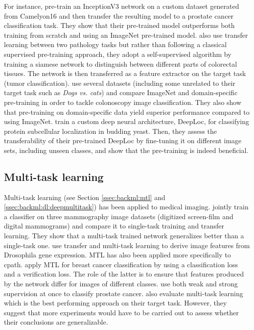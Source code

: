 For instance, \citeauthor{khan2019improving} \cite{khan2019improving} pre-train an InceptionV3 network on a custom dataset generated from Camelyon16 and then transfer the resulting model to a prostate cancer classification task. They show that their pre-trained model outperforms both training from scratch and using an ImageNet pre-trained model. \citeauthor{medela2019few} \cite{medela2019few} also use transfer learning between two pathology tasks but rather than following a classical supervised pre-training approach, they adopt a self-supervised algorithm by training a siamese network to distinguish between different parts of colorectal tissues. The network is then transferred as a feature extractor on the target task (tumor classification). \citeauthor{shang2019and} \cite{shang2019and} use several datasets (including some unrelated to their target task such as \textit{Dogs vs. cats}) and compare ImageNet and domain-specific pre-training in order to tackle colonoscopy image classification. They also show that pre-training on domain-specific data yield superior performance compared to using ImageNet. \citeauthor{kraus2017automated} \cite{kraus2017automated} train a custom deep neural architecture, DeepLoc, for classifying protein subcellular localization in budding yeast. Then, they assess the transferability of their pre-trained DeepLoc by fine-tuning it on different image sets, including unseen classes, and show that the pre-training is indeed beneficial.

\subsection{Multi-task learning}
\label{ssec:backdp:mtl}

Multi-task learning (see Section \ref{ssec:backml:mtl} and \ref{ssec:backml:dl:deepmultitask}) has been applied to medical imaging. \citeauthor{samala2017multi} \cite{samala2017multi} jointly train a classifier on three mammography image datasets (digitized screen-film and digital mammograms) and compare it to single-task training and transfer learning. They show that a multi-task trained network generalizes better than a single-task one. \citeauthor{zhang2016deep} \cite{zhang2016deep} use transfer and multi-task learning to derive image features from Drosophila gene expression. MTL has also been applied more specifically to \acrlong{cpath}. \citeauthor{pan2018multi} \cite{pan2018multi} apply MTL for breast cancer classification by using a classification loss and a verification loss. The role of the latter is to ensure that features produced by the network differ for images of different classes. \citeauthor{arvaniti2018coupling} \cite{arvaniti2018coupling} use both weak and strong supervision at once to classify prostate cancer. \citeauthor{shang2019and} \cite{shang2019and} also evaluate multi-task learning which is the best performing approach on their target task. However, they suggest that more experiments would have to be carried out to assess whether their conclusions are generalizable.


